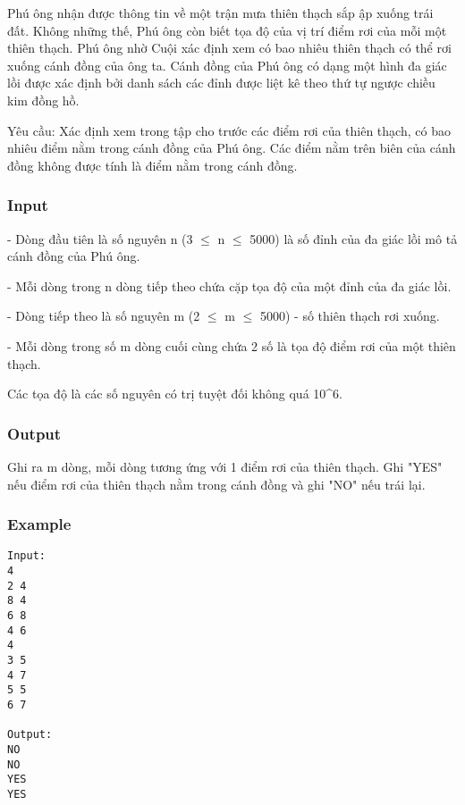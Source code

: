 



   Phú ông nhận được thông tin về một trận mưa thiên thạch sắp ập xuống trái đất. Không những thế, Phú ông còn biết tọa độ của vị trí điểm rơi của mỗi một thiên thạch. Phú ông nhờ Cuội xác định xem có bao nhiêu thiên thạch có thể rơi xuống cánh đồng của ông ta. Cánh đồng của Phú ông có dạng một hình đa giác lồi được xác định bởi danh sách các đỉnh được liệt kê theo thứ tự ngược chiều kim đồng hồ.   


       Yêu cầu:      Xác định xem trong tập cho trước các điểm rơi của thiên thạch, có bao nhiêu điểm nằm trong cánh đồng của Phú ông. Các điểm nằm trên biên của cánh đồng không được tính là điểm nằm trong cánh đồng.  

\subsubsection{   Input  }

   - Dòng đầu tiên là số nguyên n (3  $\le$  n  $\le$  5000) là số đỉnh của đa giác lồi mô tả cánh đồng của Phú ông.   


   - Mỗi dòng trong n dòng tiếp theo chứa cặp tọa độ của một đỉnh của đa giác lồi.   


   - Dòng tiếp theo là số nguyên m (2  $\le$  m  $\le$  5000) - số thiên thạch rơi xuống.   


   - Mỗi dòng trong số m dòng cuối cùng chứa 2 số là tọa độ điểm rơi của một thiên thạch.   


   Các tọa độ là các số nguyên có trị tuyệt đối không quá 10^6.  

\subsubsection{   Output  }

   Ghi ra m dòng, mỗi dòng tương ứng với 1 điểm rơi của thiên thạch. Ghi "YES" nếu điểm rơi của thiên thạch nằm trong cánh đồng và ghi "NO" nếu trái lại.  

\subsubsection{   Example  }
\begin{verbatim}
Input:
4
2 4
8 4
6 8
4 6
4
3 5
4 7
5 5
6 7

Output:
NO
NO
YES
YES
\end{verbatim}
